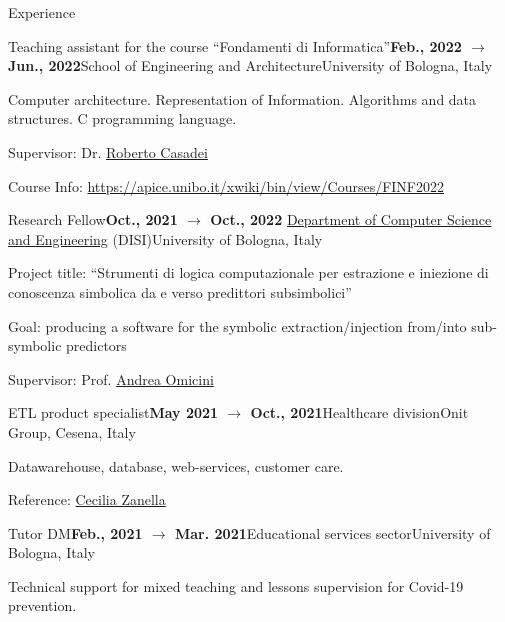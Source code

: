 \documentclass{resume} %
\begin{document}
\begin{rSection}{Experience}
        \begin{rSubsection}{Teaching assistant for the course ``Fondamenti di Informatica''}{\textbf{Feb., 2022 $\rightarrow$ Jun., 2022}}{School of Engineering and Architecture}{University of Bologna, Italy}
            \item Computer architecture. Representation of Information. Algorithms and data structures. C programming language.
            \item Supervisor: Dr. \href{mailto:roberto.casadei@unibo.it}{Roberto Casadei}
            \item Course Info: \url{https://apice.unibo.it/xwiki/bin/view/Courses/FINF2022}
        \end{rSubsection}
        
        \begin{rSubsection}{Research Fellow}{\textbf{Oct., 2021 $\rightarrow$ Oct., 2022}}{ \href{https://disi.unibo.it/it}{Department of Computer Science and Engineering} (DISI)}{University of Bologna, Italy}
            \item Project title: ``Strumenti di logica computazionale per estrazione e iniezione di conoscenza simbolica da e verso predittori subsimbolici''
            \item Goal: producing a software for the symbolic extraction/injection from/into sub-symbolic predictors
            \item Supervisor: Prof. \href{mailto:andrea.omicini@unibo.it}{Andrea Omicini}
        \end{rSubsection}
        
        \begin{rSubsection}{ETL product specialist}{\textbf{May 2021 $\rightarrow$ Oct., 2021}}{Healthcare division}{Onit Group, Cesena, Italy}
            \item Datawarehouse, database, web-services, customer care.
            \item Reference: \href{mailto:czanella@onit.it}{Cecilia Zanella}
        \end{rSubsection}
        
        \begin{rSubsection}{Tutor DM}{\textbf{Feb., 2021 $\rightarrow$ Mar. 2021}}{Educational services sector}{University of Bologna, Italy}
            \item Technical support for mixed teaching and lessons supervision for Covid-19 prevention.
        \end{rSubsection}
        

\end{rSection}
\end{document}
